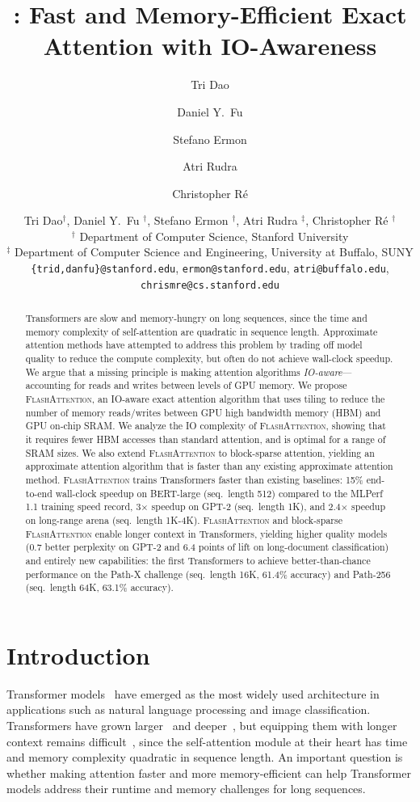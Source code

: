 \documentclass{article}
\title{\sysname: Fast and Memory-Efficient Exact Attention with IO-Awareness}
\author[$\dagger$]{Tri Dao}
\author[$\dagger$]{Daniel Y.\ Fu}
\author[$\dagger$]{Stefano Ermon}
\author[$\ddagger$]{Atri Rudra}
\author[$\dagger$]{Christopher R{\'e}}
\affil[$\dagger$]{Department of Computer Science, Stanford University}
\affil[$\ddagger$]{Department of Computer Science and Engineering, University at Buffalo, SUNY\vspace{4pt}}
\affil[ ]{{\texttt{\{trid,danfu\}@cs.stanford.edu}, \texttt{ermon@stanford.edu}, \texttt{atri@buffalo.edu}, \texttt{chrismre@cs.stanford.edu}}}
\author{
  Tri Dao$^{\dagger}$, Daniel Y.\ Fu $^\dagger$, Stefano Ermon $^\dagger$, Atri Rudra $^\ddagger$, Christopher R\'{e} $^\dagger$\\
  $^\dagger$ Department of Computer Science, Stanford University\\
  $^\ddagger$ Department of Computer Science and Engineering, University at Buffalo, SUNY\\
  {\small\texttt{\{trid,danfu\}@stanford.edu}, \texttt{ermon@stanford.edu}, \texttt{atri@buffalo.edu}, \texttt{chrismre@cs.stanford.edu}}
}
\newcommand{\sysname}{\textsc{FlashAttention}\xspace}
\begin{document}
\maketitle

\begin{abstract}

Transformers are slow and memory-hungry on long sequences, since the time and memory complexity of self-attention are quadratic in sequence length.
Approximate attention methods have attempted to address this problem by
trading off model quality to reduce the compute complexity, but often do not achieve wall-clock speedup.
We argue that a missing principle is making attention algorithms \textit{IO-aware}---accounting for reads and writes between levels of GPU memory.
We propose \sysname, an IO-aware exact attention algorithm that uses tiling to reduce the number of memory reads/writes between GPU high bandwidth memory (HBM) and GPU on-chip SRAM.
We analyze the IO complexity of \sysname, showing that it requires fewer HBM accesses than standard attention, and is optimal for a range of SRAM sizes.
We also extend \sysname to block-sparse attention, yielding an approximate attention algorithm that is faster than any existing approximate attention method.
\sysname trains Transformers faster than existing baselines: 15\% end-to-end wall-clock speedup on BERT-large (seq.\ length 512) compared to the MLPerf 1.1 training speed record, 3$\times$ speedup on GPT-2 (seq.\ length 1K), and 2.4$\times$ speedup on long-range arena (seq.\ length 1K-4K).
\sysname and block-sparse \sysname enable longer context in Transformers, yielding higher quality models (0.7 better perplexity on GPT-2 and 6.4 points of lift on long-document classification) and entirely new capabilities: the first Transformers to achieve better-than-chance performance on the Path-X challenge (seq.\ length 16K, 61.4\% accuracy) and Path-256 (seq.\ length 64K, 63.1\% accuracy).

\end{abstract}

\section{Introduction}
\label{sec:intro}

Transformer models~\citep{vaswani2017attention} have emerged as the most widely used architecture in applications such as natural language processing and image classification.
Transformers have grown larger~\citep{brown2020language} and deeper~\citep{wang2022deepnet}, but equipping them with longer context remains difficult~\citep{tay2020long}, since the self-attention module at their heart has time and memory complexity quadratic in sequence length.
An important question is whether making attention faster and more memory-efficient can help Transformer models address their runtime and memory challenges for long sequences.
\end{document}
